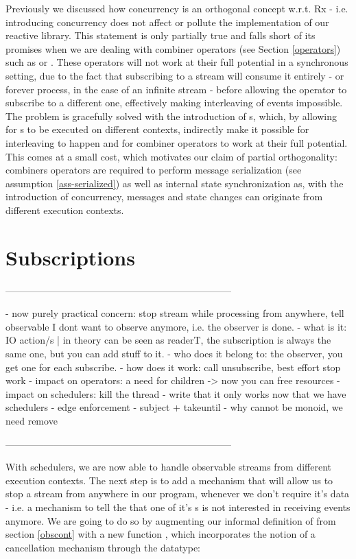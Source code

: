 Previously we discussed how concurrency is an orthogonal concept w.r.t. Rx - i.e. introducing concurrency does not affect or pollute the implementation of our reactive library. This statement is only partially true and falls short of its promises when we are dealing with combiner operators (see Section \ref{operators}) such as \code{(>>=)} or . These operators will not work at their full potential in a synchronous setting, due to the fact that subscribing to a stream will consume it entirely - or forever process, in the case of an infinite stream - before allowing the operator to subscribe to a different one, effectively making interleaving of events impossible. The problem is gracefully solved with the introduction of s, which, by allowing for s to be executed on different contexts, indirectly make it possible for interleaving to happen and for combiner operators to work at their full potential. This comes at a small cost, which motivates our claim of partial orthogonality: combiners operators are required to perform message serialization (see assumption \ref{ass-serialized}) as well as internal state synchronization as, with the introduction of concurrency, messages and state changes can originate from different execution contexts.


\section{Subscriptions}
\label{sec:subscriptions}

-----------------------------------------------------------------------

- now purely practical concern: stop stream while processing from anywhere, tell observable I dont want to observe anymore, i.e. the observer is done.
- what is it: IO action/s | in theory can be seen as readerT, the subscription is always the same one, but you can add stuff to it. 
- who does it belong to: the observer, you get one for each subscribe.
- how does it work: call unsubscribe, best effort stop work
- impact on operators: a need for children -> now you can free resources 
- impact on schedulers: kill the thread
- write that it only works now that we have schedulers
- edge enforcement
- subject + takeuntil
- why cannot be monoid, we need remove

-----------------------------------------------------------------------

With schedulers, we are now able to handle observable streams from different execution contexts. The next step is to add a mechanism that will allow us to stop a stream from anywhere in our program, whenever we don't require it's data - i.e. a mechanism to tell the  that one of it's s is not interested in receiving events anymore. We are going to do so by augmenting our informal definition of  from section \ref{obscont} with a new function \code{(\%)}, which incorporates the notion of a cancellation mechanism through the  datatype:\\

